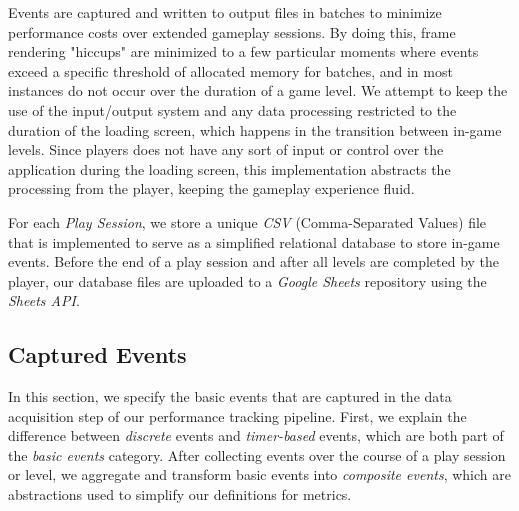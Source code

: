 

Events are captured and written to output files in batches to minimize performance costs over extended gameplay sessions. By doing this, frame rendering "hiccups" are minimized to a few particular moments where events exceed a specific threshold of allocated memory for batches, and in most instances do not occur over the duration of a game level. We attempt to keep the use of the input/output system and any data processing restricted to the duration of the loading screen, which happens in the transition between in-game levels. Since players does not have any sort of input or control over the application during the loading screen, this implementation abstracts the processing from the player, keeping the gameplay experience fluid.


For each \emph{Play Session}, we store a unique \emph{CSV} (Comma-Separated Values) file that is implemented to serve as a simplified relational database to store in-game events. Before the end of a play session and after all levels are completed by the player, our database files are uploaded to a \emph{Google Sheets} repository using the \emph{Sheets API}.

\subsection{Captured Events}

In this section, we specify the basic events that are captured in the data acquisition step of our performance tracking pipeline. First, we explain the difference between \emph{discrete} events and \emph{timer-based} events, which are both part of the \emph{basic events} category. After collecting events over the course of a play session or level, we aggregate and transform basic events into \emph{composite events}, which are abstractions used to simplify our definitions for metrics.


